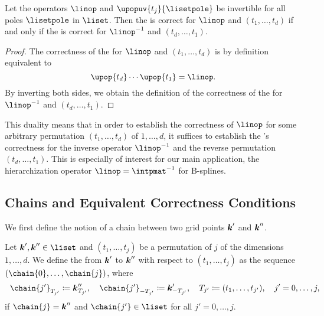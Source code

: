 \begin{lemma}
  \label{lemma:dualityUnidirectionalPrinciple}
  Let the operators $\linop$ and $\upopuv{t_j}{\lisetpole}$ be invertible
  for all poles $\lisetpole$ in $\liset$.
  Then the \up is correct for $\linop$ and $(t_1, \dotsc, t_d)$
  if and only if the \up is correct for $\linopinv$ and $(t_d, \dotsc, t_1)$.
\end{lemma}

\begin{proof}
  The correctness of the \up for $\linop$ and $(t_1, \dotsc, t_d)$
  is by definition equivalent to
  \begin{equation}
    \upop{t_d} \dotsm \upop{t_1} = \linop.
  \end{equation}
  By inverting both sides, we obtain the definition of the
  correctness of the \up for $\linopinv$ and $(t_d, \dotsc, t_1)$.
\end{proof}

This duality means that in order to establish the correctness of $\linop$
for some arbitrary permutation $(t_1, \dotsc, t_d)$ of $1, \dotsc, d$,
it suffices to establish the \up's correctness for the
inverse operator $\linopinv$ and the reverse permutation $(t_d, \dotsc, t_1)$.
This is especially of interest for our main application,
the hierarchization operator $\linop = \intpmatinv$ for B-splines.



\subsection{Chains and Equivalent Correctness Conditions}
\label{sec:453chains}

We first define the notion of a chain between two grid points
${\boldsymbol{k}}'$ and ${\boldsymbol{k}}''$.

\begin{definition}[chain]
  \label{def:chain}
  Let $\*k', \*k'' \in \liset$ and
  $(t_1, \dotsc, t_j)$ be a permutation of $j$ of the
  dimensions $1, \dotsc, d$.
  We define the  from ${\boldsymbol{k}}'$ to ${\boldsymbol{k}}''$ with respect to
  $(t_1, \dotsc, t_j)$ as the sequence
  $(\chain{0}, \dotsc, \chain{j})$, where
  \begin{equation}
    \chain{j'}_{T_{j'}}
    \ceq \*k''_{T_{j'}},\quad
    \chain{j'}_{-T_{j'}}
    \ceq \*k'_{-T_{j'}},\quad
    T_{j'}
    \ceq (t_1, \dotsc, t_{j'}),\quad
    j' = 0, \dotsc, j,
    \hspace*{-10mm}
  \end{equation}
  if $\chain{j} = \*k''$ and
  $\chain{j'} \in \liset$ for all $j' = 0, \dotsc, j$.
\end{definition}

